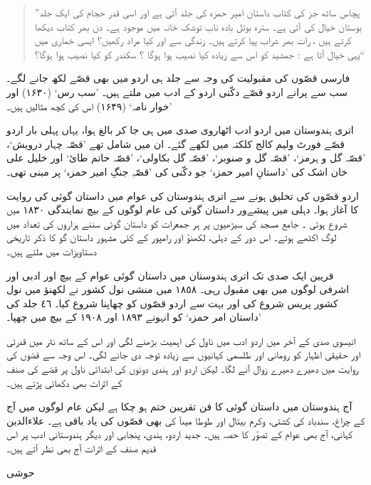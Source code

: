 \documentclass[a4paper]{article}
\newcommand{\deco}{\psvectorian[height=0.75cm]{71}}
\newcommand{\subtitle}[1]{\begingroup\fontsize{24pt}{12pt}\titlefont #1\endgroup\nopagebreak}
\begin{document}
\begin{quote}
”پچاس ساٹھ جز کی کتاب داستان امیر حمزہ کی جلد آئی ہے اور اسی قدر حجام کی ایک جلد بوستان خیال کی آئی ہے۔ سترہ بوتل بادہ ناب توشک خانہ میں موجود ہے۔ دن بھر کتاب دیکھا کرتے ہیں ، رات بھر شراب پیا کرتے ہیں۔ زندگی سے اور کیا مراد رکھیں؟ ایسی خماری میں یہی خیال آتا ہے : جمشید کو اس سے زیادہ کیا نصیب ہوا ہوگا ؟ سکندر کو کیا نصیب ہوا ہوگا؟“
\end{quote}

فارسی قصّوں کی مقبولیت کی وجہ سے جلد ہی اردو میں بھی قصّے لکھ جانے لگے۔ سب سے پرانے اردو قصّے دکّنی اردو کے  ادب میں ملتے ہیں۔ ’سب رس‘ (۱۶۳۰) اور ’خوار نامہ‘ (۱۶۴۹) اس کی کچھ مثالیں ہیں۔

اتری ہندوستان میں اردو ادب اٹھاروی صدی میں ہی جا کر بالغ ہوا، یہاں پہلی بار اردو قصّے فورٹ ولیم کالج کلکتہ میں لکھے گئے۔ ان میں شامل تھے ’قصّہ چہار درویش‘، ’قصّہ گل و ہرمز‘، ’قصّہ گل و صنوبر‘، ’قصّہ گل بکاولی‘، ’قصّہ حاتم طائ‘ اور خلیل علی خان اشک کی ’داستانِ امیر حمزہ‘ جو دکّنی کی ’قصّہِ جنگِ امیر حمزہ‘ پر مبنی تھی۔

اردو قصّوں کی تخلیق ہونے سے اتری ہندوستان کی عوام میں داستان گوئی کی روایت کا آغاز ہوا۔ دہلی  میں  پیشےور داستان گوئی کی عام لوگوں کے بیچ نمایندگی ١٨٣٠ میں شروع ہوئی ۔ جامع مسجد کی سیڑھیوں پر ہر  جمعرات کو داستان گوئی سننے ہزاروں کی تعداد میں لوگ اکٹھے ہوتے۔ اس دور کے  دہلی، لکھنؤ اور رامپور کے کئی  مشہور داستان گو کا ذکر تاریخی دستاویزات میں  ملتے ہیں۔

قریبن ایک صدی تک اتری ہندوستان میں داستان گوئی عوام کے بیچ اور ادبی اور اشرفی لوگوں میں بھی مقبول رہی۔ ١٨٥٨ میں منشی نول کشور نے لکھنؤ میں نول کشور پریس شروع کی اور بہت سے اردو قصّوں کو چھاپنا شروع کیا۔ ٤٦ جلد کی ’داستان امر حمزہ‘ کو انہونے ١٨٩٣ اور ١٩٠٨ کے بیچ میں چھپا۔

انیسوی صدی کے آخر میں اردو ادب میں ناول کی اہمیت بڑھنے لگی اور اس کے ساتھ نثر میں قدرتی اور حقیقی اظہار کو رومانی اور طلسمی کہانیوں سے زیادہ توجہ دی جانے لگی۔ اس وجہ سے قصّوں کی روایت میں دھیرے  دھیرے زوال آنے لگا۔ لیکن اردو اور ہندی دونوں کی ابتدائی ناول پر قصّے کی صنف کے اثرات بھی دکھائی پڑتے ہیں۔

 آج ہندوستان میں داستان گوئی کا فن تقریبن ختم ہو چکا ہے لیکن عام لوگوں میں آج بھی قصّوں کی یاد باقی ہے۔ علاءالدين‎ کے چراغ، سندباد کی کشتی، وکرم بیتال اور طوطا میںآ کی کہانی، آج بھی عوام کے تصؤر کا حصہ  ہیں۔ جدید اردو، ہندی، پنجابی اور دیگر ہندوستانی ادب پر اس قدیم صنف کے اثرات آج بھی نظر آتے ہیں۔

\begin{center}
\deco

\subtitle{حوشی}
\end{center}
\end{document}
